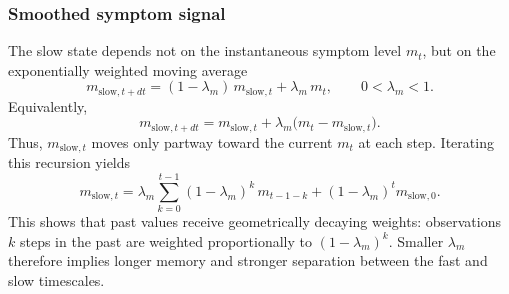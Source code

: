 \documentclass[man,12pt,floatsintext]{apa7}
\begin{document}
\subsubsection{Smoothed symptom signal}
The slow state depends not on the instantaneous symptom level \(m_t\), but on the exponentially weighted moving average
\[
m_{\text{slow},t+dt} = (1-\lambda_m)\,m_{\text{slow},t} + \lambda_m\,m_t,
\qquad 0<\lambda_m<1.
\]
Equivalently,
\[
m_{\text{slow},t+dt}=m_{\text{slow},t}+\lambda_m\big(m_t-m_{\text{slow},t}\big).
\]
Thus, \(m_{\text{slow},t}\) moves only partway toward the current \(m_t\) at each step.
Iterating this recursion yields
\[
m_{\text{slow},t}
=
\lambda_m\sum_{k=0}^{t-1}(1-\lambda_m)^k\,m_{t-1-k}
+
(1-\lambda_m)^t m_{\text{slow},0}.
\]
This shows that past values receive geometrically decaying weights: observations \(k\) steps in the past are weighted proportionally to \((1-\lambda_m)^k\). Smaller \(\lambda_m\) therefore implies longer memory and stronger separation between the fast and slow timescales.
\end{document}
